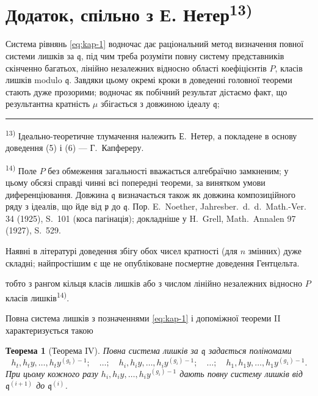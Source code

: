 \documentclass[11pt]{article}
\newcommand{\foreign}[1]{#1}
\theoremstyle{plain}
\newtheorem{satz}{Теорема}
\begin{document}
\newpage
\section*{Додаток, спільно з Е. Нетер\textsuperscript{13)}}

Система рівнянь \eqref{eq:kap-1} водночас дає раціональний метод
визначення повної системи лишків за $\mathfrak{q}$, під чим треба
розуміти повну систему представників скінченно багатьох, лінійно
незалежних відносно області коефіцієнтів $P$, класів лишків modulo
$\mathfrak{q}$. Завдяки цьому окремі кроки в доведенні головної
теореми стають дуже прозорими; водночас як побічний результат
дістаємо факт, що результантна кратність $\mu$ збігається з
довжиною ідеалу $\mathfrak{q}$;

\vspace{0.5em}
\noindent\rule{\textwidth}{0.4pt}
\vspace{0.3em}

{\footnotesize
\textsuperscript{13)} Ідеально-теоретичне тлумачення належить Е.\ Нетер, а
покладене в основу доведення (5) і (6) --- Г.\ Капфереру.

\textsuperscript{14)} Поле $P$ без обмеження загальності вважається
алгебраїчно замкненим; у цьому обсязі справді чинні всі попередні
теореми, за винятком умови диференціювання. Довжина $\mathfrak{q}$
визначається також як довжина композиційного ряду з ідеалів, що йде
від $\mathfrak{p}$ до $\mathfrak{q}$. Пор. E.\ Noether,
\foreign{Jahresber.\ d.\ d.\ Math.-Ver.} 34 (1925), S.~101
(коса пагінація); докладніше у H.\ Grell, \foreign{Math.\ Annalen} 97
(1927), S.~529.

Наявні в літературі доведення збігу обох чисел кратності (для $n$
змінних) дуже складні; найпростішим є ще не опубліковане посмертне
доведення Гентцельта.
}

\vspace{1em}
тобто з рангом кільця класів лишків або з числом лінійно незалежних
відносно $P$ класів лишків\textsuperscript{14)}.

Повна система лишків з позначеннями \eqref{eq:kap-1} і допоміжної
теореми II характеризується такою

\begin{satz}[Теорема IV]\label{satz:kap-IV}
Повна система лишків за $\mathfrak{q}$ задається поліномами
\[
h_{t}, h_{t}y, \ldots, h_{t}y^{(g_{t})-1}; \quad \ldots; \quad
h_{i}, h_{i}y, \ldots, h_{i}y^{(g_{i})-1}; \quad \ldots; \quad
h_{1}, h_{1}y, \ldots, h_{1}y^{(g_{1})-1}.
\]
При цьому кожного разу
$h_{i}, h_{i}y, \ldots, h_{i}y^{(g_{i})-1}$ дають повну систему
лишків від $\mathfrak{q}^{(i+1)}$ до $\mathfrak{q}^{(i)}$.
\end{satz}
\end{document}

